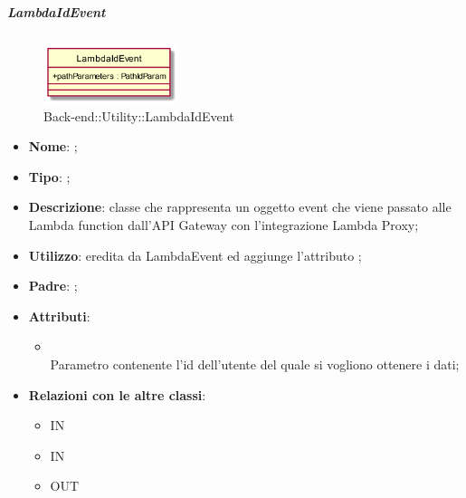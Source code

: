 \hypertarget{LambdaIdEvent_label}{\subparagraph{LambdaIdEvent}}
\begin{figure}[h]
	\centering
	\includegraphics[width=0.35\textwidth,height=\textheight,keepaspectratio]{images/ClassLambdaIdEvent.png}
	\caption{Back-end::Utility::LambdaIdEvent}
\end{figure}
\begin{itemize}
	\item \textbf{Nome}: ;
	\item \textbf{Tipo}: ;
	\item \textbf{Descrizione}: classe che rappresenta un oggetto event che viene passato alle Lambda function dall'API Gateway con l'integrazione Lambda Proxy;
	\item \textbf{Utilizzo}: eredita da LambdaEvent ed aggiunge l'attributo ;
	\item \textbf{Padre}: ;
	\item \textbf{Attributi}:
	\begin{itemize}
		\item[]  \\
		Parametro contenente l'id dell'utente del quale si vogliono ottenere i dati;
	\end{itemize}
	\item \textbf{Relazioni con le altre classi}:
	\begin{itemize}
		\item IN \hyperlink{RulesService_label}{}
		\item IN \hyperlink{UsersService_label}{}
		\item OUT \hyperlink{PathIdParam_label}{}
	\end{itemize}
\end{itemize}
\FloatBarrier

